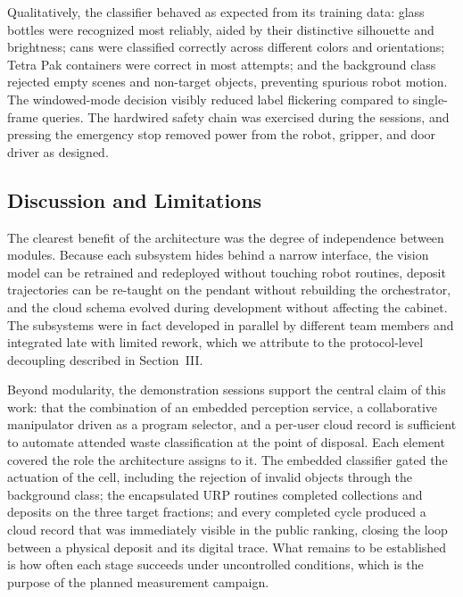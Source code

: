 \documentclass[conference]{IEEEtran}
\begin{document}
Qualitatively, the classifier behaved as expected from its training data: glass bottles were recognized most reliably, aided by their distinctive silhouette and brightness; cans were classified correctly across different colors and orientations; Tetra Pak containers were correct in most attempts; and the background class rejected empty scenes and non-target objects, preventing spurious robot motion. The windowed-mode decision visibly reduced label flickering compared to single-frame queries. The hardwired safety chain was exercised during the sessions, and pressing the emergency stop removed power from the robot, gripper, and door driver as designed.

\subsection{Discussion and Limitations}
The clearest benefit of the architecture was the degree of independence between modules. Because each subsystem hides behind a narrow interface, the vision model can be retrained and redeployed without touching robot routines, deposit trajectories can be re-taught on the pendant without rebuilding the orchestrator, and the cloud schema evolved during development without affecting the cabinet. The subsystems were in fact developed in parallel by different team members and integrated late with limited rework, which we attribute to the protocol-level decoupling described in Section~III.

Beyond modularity, the demonstration sessions support the central claim of this work: that the combination of an embedded perception service, a collaborative manipulator driven as a program selector, and a per-user cloud record is sufficient to automate attended waste classification at the point of disposal. Each element covered the role the architecture assigns to it. The embedded classifier gated the actuation of the cell, including the rejection of invalid objects through the background class; the encapsulated URP routines completed collections and deposits on the three target fractions; and every completed cycle produced a cloud record that was immediately visible in the public ranking, closing the loop between a physical deposit and its digital trace. What remains to be established is how often each stage succeeds under uncontrolled conditions, which is the purpose of the planned measurement campaign.
\end{document}
